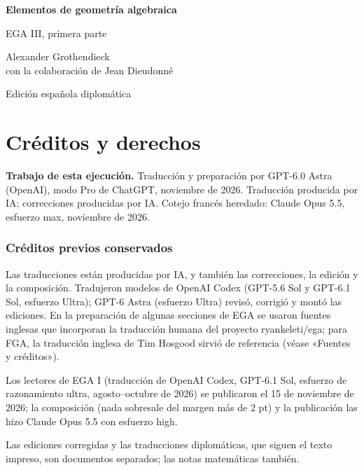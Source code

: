 \documentclass[10pt,oneside,openany]{book}
\theoremstyle{egaenv}\newtheorem*{env}{---}
\theoremstyle{egastatement}
\theoremstyle{egadescription}
\begin{document}
\begin{titlepage}\centering\vspace*{20mm}
{\Huge\bfseries Elementos de geometría algebraica\par}\vspace{14mm}
{\LARGE EGA III, primera parte\par}\vspace{10mm}
{\large Alexander Grothendieck\\con la colaboración de Jean Dieudonné\par}
\vfill{\Large Edición española diplomática\par}
\vspace{8mm}{\large 25 de noviembre de 2026\par}\end{titlepage}
\chapter*{Créditos y derechos}
\noindent\textbf{Trabajo de esta ejecución.} Traducción y preparación por GPT-6.0 Astra (OpenAI), modo Pro de ChatGPT, noviembre de 2026. Traducción producida por IA; correcciones producidas por IA. Cotejo francés heredado: Claude Opus 5.5, esfuerzo max, noviembre de 2026.

\subsection*{Créditos previos conservados}

Las traducciones están producidas por IA, y también las correcciones, la edición y la composición. Tradujeron
modelos de OpenAI Codex (GPT-5.6 Sol y GPT-6.1 Sol, esfuerzo Ultra); GPT-6 Astra (esfuerzo Ultra) revisó, corrigió
y montó las ediciones. En la
preparación de algunas secciones de EGA se usaron fuentes inglesas que incorporan la traducción humana del proyecto
ryankeleti/ega; para FGA, la traducción inglesa de Tim Hosgood sirvió de referencia (véase «Fuentes y créditos»).

Los lectores de EGA I (traducción de OpenAI Codex, GPT-6.1 Sol, esfuerzo de razonamiento ultra, agosto–octubre
de 2026) se publicaron el 15 de noviembre de 2026; la composición (nada sobresale del margen más de 2 pt) y la
publicación las hizo Claude Opus 5.5 con esfuerzo high.

Las ediciones corregidas y las traducciones diplomáticas, que siguen el texto impreso, son documentos separados; las
notas matemáticas también.
\end{document}
